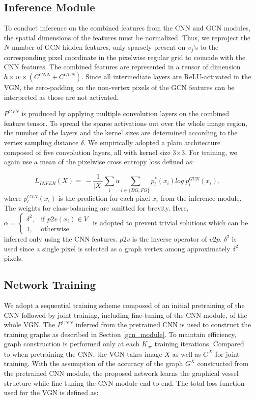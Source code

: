 \documentclass[runningheads,a4paper]{llncs}
\begin{document}
\subsection{Inference Module}\label{infer_module}

To conduct inference on the combined features from the CNN and GCN modules, the spatial dimensions of the features must be normalized. Thus, we reproject the $N$ number of GCN hidden features, only sparsely present on $v_{j}$'s to the corresponding pixel coordinate in the pixelwise regular grid to coincide with the CNN features. The combined features are represented in a tensor of dimension $h \times w \times (C^{CNN}+C^{GCN})$. Since all intermediate layers are ReLU-activated in the VGN, the zero-padding on the non-vertex pixels of the GCN features can be interpreted as those are not activated.

$P^{GVN}$ is produced by applying multiple convolution layers on the combined feature tensor. To spread the sparse activations out over the whole image region, the number of the layers and the kernel sizes are determined according to the vertex sampling distance $\delta$. We empirically adopted a plain architecture composed of five convolution layers, all with kernel size 3$\times$3. For training, we again use a mean of the pixelwise cross entropy loss defined as:

\begin{equation}
\label{eq:INFER_loss}
L_{INFER}(X) =\ -\frac{1}{|X|}\sum_{i}\alpha\sum_{l\in\{BG,FG\}}{p_l^*(x_i)log\ p_l^{GVN}(x_i)},
\end{equation}
where $p_l^{GVN}(x_i)$ is the prediction for each pixel $x_i$ from the inference module. The weights for class-balancing are omitted for brevity. Here, $\alpha= 
\begin{cases}
	\delta^2, & \text{if } p2v(x_i) \in V\\
	1, & \text{otherwise}
\end{cases}$ is adopted to prevent trivial solutions which can be inferred only using the CNN features. $p2v$ is the inverse operator of $v2p$. $\delta^2$ is used since a single pixel is selected as a graph vertex among approximately $\delta^2$ pixels.

\subsection{Network Training}\label{net_training}

We adopt a sequential training scheme composed of an initial pretraining of the CNN followed by joint training, including fine-tuning of the CNN module, of the whole VGN. The $P^{CNN}$ inferred from the pretrained CNN is used to construct the training graphs as described in Section \ref{gcn_module}. To maintain efficiency, graph construction is performed only at each $K_{gc}$ training iterations. Compared to when pretraining the CNN, the VGN takes image $X$ as well as $G^X$ for joint training. With the assumption of the accuracy of the graph $G^X$ constructed from the pretrained CNN module, the proposed network learns the graphical vessel structure while fine-tuning the CNN module end-to-end. The total loss function used for the VGN is defined as:
\end{document}
